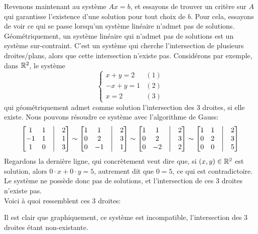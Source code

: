 \noindent Revenons maintenant au système $Ax=b$, et essayons de trouver un critère sur $A$ qui garantisse l'existence d'une solution pour tout choix de $b$. Pour cela, essayons de voir ce qui se passe lorsqu'un système linéaire n'admet pas de solutions. \\
Géométriquement, un système linéaire qui n'admet pas de solutions est un système sur-contraint. C'est un système qui cherche l'intersection de plusieurs droites/plans, alors que cette intersection n'existe pas. Considérons par exemple, dans $\mathbb{R}^2$, le système 
$$\begin{cases} 
x+y=2 & (1)\\
-x+y=1 & (2)\\
x=2 & (3)
\end{cases}$$
qui géométriquement admet comme solution l'intersection des 3 droites, si elle existe. Nous pouvons résoudre ce système avec l'algorithme de Gauss:
$$\begin{bmatrix}
1 & 1 & \bigm| & 2 \\
-1 & 1 & \bigm| & 1 \\
1 & 0 & \bigm| & 3 \\
\end{bmatrix} \sim 
\begin{bmatrix}
1 & 1 & \bigm| & 2 \\
0 & 2 & \bigm| & 3 \\
0 & -1 & \bigm| & 1 \\
\end{bmatrix} \sim 
\begin{bmatrix}
1 & 1 & \bigm| & 2 \\
0 & 2 & \bigm| & 3 \\
0 & -2 & \bigm| & 2 \\
\end{bmatrix} \sim 
\begin{bmatrix}
1 & 1 & \bigm| & 2 \\
0 & 2 & \bigm| & 3 \\
0 & 0 & \bigm| & 5 \\
\end{bmatrix}$$
Regardons la dernière ligne, qui concrètement veut dire que, si $(x,y) \in \mathbb{R}^2$ est solution, alors $0\cdot x + 0\cdot y = 5$, autrement dit que $0=5$, ce qui est contradictoire. Le système ne possède donc pas de solutions, et l'intersection de ces 3 droites n'existe pas. \\
Voici à quoi ressemblent ces 3 droites:
\begin{center}
\end{center}
Il est clair que graphiquement, ce système est incompatible, l'intersection des 3 droites étant non-existante. \\

